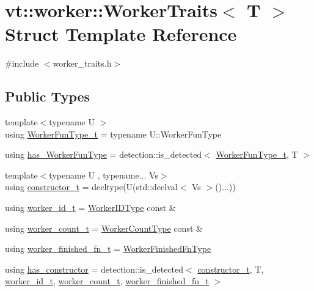 \hypertarget{structvt_1_1worker_1_1_worker_traits}{}\section{vt\+:\+:worker\+:\+:Worker\+Traits$<$ T $>$ Struct Template Reference}
\label{structvt_1_1worker_1_1_worker_traits}


{\ttfamily \#include $<$worker\+\_\+traits.\+h$>$}

\subsection*{Public Types}
\begin{DoxyCompactItemize}
\item 
{\footnotesize template$<$typename U $>$ }\\using \hyperlink{structvt_1_1worker_1_1_worker_traits_a62aa14ab158ff54d290cc2124c5ce3e1}{Worker\+Fun\+Type\+\_\+t} = typename U\+::\+Worker\+Fun\+Type
\item 
using \hyperlink{structvt_1_1worker_1_1_worker_traits_a69eeffd4c60f5b1a129e20ef0a85827d}{has\+\_\+\+Worker\+Fun\+Type} = detection\+::is\+\_\+detected$<$ \hyperlink{structvt_1_1worker_1_1_worker_traits_a62aa14ab158ff54d290cc2124c5ce3e1}{Worker\+Fun\+Type\+\_\+t}, T $>$
\item 
{\footnotesize template$<$typename U , typename... Vs$>$ }\\using \hyperlink{structvt_1_1worker_1_1_worker_traits_a37e115e6de3c0dce681e017d2bd0baab}{constructor\+\_\+t} = decltype(U(std\+::declval$<$ Vs $>$()...))
\item 
using \hyperlink{structvt_1_1worker_1_1_worker_traits_a001b1872338e22e51f91bde53cf2cb0a}{worker\+\_\+id\+\_\+t} = \hyperlink{namespacevt_a656e362091da17b9b93d0655b36e3392}{Worker\+I\+D\+Type} const  \&
\item 
using \hyperlink{structvt_1_1worker_1_1_worker_traits_af8f4b5fb160922a2d259889c19ef9ad5}{worker\+\_\+count\+\_\+t} = \hyperlink{namespacevt_aa93398ea48f2cb6c188512250f7cc248}{Worker\+Count\+Type} const  \&
\item 
using \hyperlink{structvt_1_1worker_1_1_worker_traits_a56b88053f1de41d391048fb82ab513f0}{worker\+\_\+finished\+\_\+fn\+\_\+t} = \hyperlink{namespacevt_1_1worker_ae32a174a5348d27aafe73c2debea1a94}{Worker\+Finished\+Fn\+Type}
\item 
using \hyperlink{structvt_1_1worker_1_1_worker_traits_ac7982bde8aa7e29a3da7cd87d5db2048}{has\+\_\+constructor} = detection\+::is\+\_\+detected$<$ \hyperlink{structvt_1_1worker_1_1_worker_traits_a37e115e6de3c0dce681e017d2bd0baab}{constructor\+\_\+t}, T, \hyperlink{structvt_1_1worker_1_1_worker_traits_a001b1872338e22e51f91bde53cf2cb0a}{worker\+\_\+id\+\_\+t}, \hyperlink{structvt_1_1worker_1_1_worker_traits_af8f4b5fb160922a2d259889c19ef9ad5}{worker\+\_\+count\+\_\+t}, \hyperlink{structvt_1_1worker_1_1_worker_traits_a56b88053f1de41d391048fb82ab513f0}{worker\+\_\+finished\+\_\+fn\+\_\+t} $>$

\end{DoxyCompactItemize}
